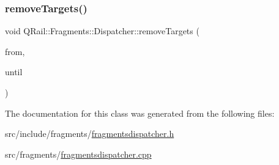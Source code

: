 \subsubsection{\texorpdfstring{removeTargets()}{removeTargets()}}
{\footnotesize\ttfamily void Q\+Rail\+::\+Fragments\+::\+Dispatcher\+::remove\+Targets (\begin{DoxyParamCaption}\item[{const Q\+Date\+Time \&}]{from,  }\item[{const Q\+Date\+Time \&}]{until }\end{DoxyParamCaption})}



The documentation for this class was generated from the following files\+:\begin{DoxyCompactItemize}
\item 
src/include/fragments/\mbox{\hyperlink{fragmentsdispatcher_8h}{fragmentsdispatcher.\+h}}\item 
src/fragments/\mbox{\hyperlink{fragmentsdispatcher_8cpp}{fragmentsdispatcher.\+cpp}}\end{DoxyCompactItemize}
